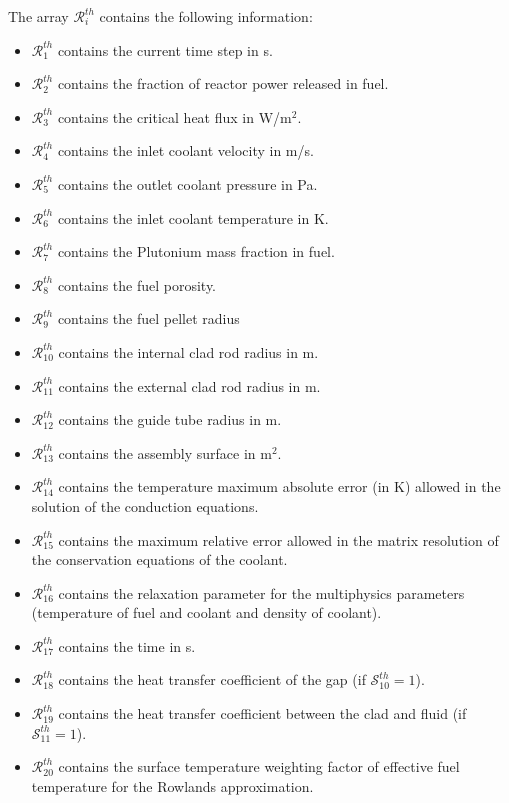 The array $\mathcal{R}^{th}_{i}$ contains the following information: 

\begin{itemize}
\item $\mathcal{R}^{th}_{1}$ contains the current time step in s. 
\item $\mathcal{R}^{th}_{2}$ contains the fraction of reactor power released in fuel.
\item $\mathcal{R}^{th}_{3}$ contains the critical heat flux in W/m$^2$.
\item $\mathcal{R}^{th}_{4}$ contains the inlet coolant velocity in m/s.
\item $\mathcal{R}^{th}_{5}$ contains the outlet coolant pressure in Pa.
\item $\mathcal{R}^{th}_{6}$ contains the inlet coolant temperature in K.
\item $\mathcal{R}^{th}_{7}$ contains the Plutonium mass fraction in fuel.
\item $\mathcal{R}^{th}_{8}$ contains the fuel porosity.
\item $\mathcal{R}^{th}_{9}$ contains the fuel pellet radius
\item $\mathcal{R}^{th}_{10}$ contains the internal clad rod radius in m.
\item $\mathcal{R}^{th}_{11}$ contains the external clad rod radius in m.
\item $\mathcal{R}^{th}_{12}$ contains the guide tube radius in m.
\item $\mathcal{R}^{th}_{13}$ contains the assembly surface in m$^2$.
\item $\mathcal{R}^{th}_{14}$ contains the temperature maximum absolute error (in K) allowed in the solution of the conduction equations.
\item $\mathcal{R}^{th}_{15}$ contains the maximum relative error allowed in the matrix resolution of the conservation equations of the coolant.
\item $\mathcal{R}^{th}_{16}$ contains the relaxation parameter for the multiphysics parameters (temperature of fuel and coolant  and density of coolant).
\item $\mathcal{R}^{th}_{17}$ contains the time in s.
\item $\mathcal{R}^{th}_{18}$ contains the heat transfer coefficient of the gap (if $\mathcal{S}^{th}_{10}=1$).
\item $\mathcal{R}^{th}_{19}$ contains the heat transfer coefficient between the clad and fluid (if $\mathcal{S}^{th}_{11}=1$).
\item $\mathcal{R}^{th}_{20}$ contains the surface temperature weighting factor of effective fuel temperature for the Rowlands approximation.
\end{itemize}
\clearpage

